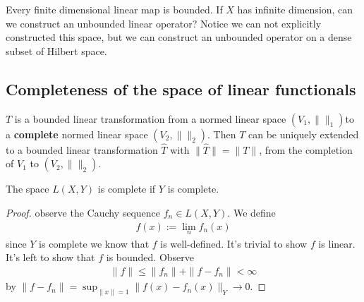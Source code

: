 \begin{remark}
Every finite dimensional linear map is bounded. If $X$ has infinite dimension, can we construct an unbounded linear operator? Notice we can not explicitly constructed this space, but we can construct an unbounded operator on a dense subset of Hilbert space.  	
\end{remark}



\subsection{Completeness of the space of linear functionals}
\begin{theorem}[B.L.T theorem]
	$T$ is a bounded linear transformation from a normed linear space $( V_1, \| \|_1 )$to a \textbf{complete} normed linear space $(V_2, \| \|_2 )$. Then $T$ can be uniquely extended to a bounded linear transformation  $\hat{T}$ with $\|\hat{T}\| = \|T\|$, from the completion of $V_1$ to $(V_2, \|\|_2)$.  
\end{theorem}

\begin{theorem}
	The space $L(X, Y)$ is complete if $Y$ is complete. 
\end{theorem}
\begin{proof}
	observe the Cauchy sequence $f_n \in L(X,Y)$. We define 
	\begin{align*}
		f(x):= \lim_n f_n(x)
	\end{align*}
	since $Y$ is complete we know that $f$ is well-defined. It's trivial to show $f$ is linear. It's left to show that $f$ is bounded. Observe
	\begin{align*}
		\|f\| \le \|f_n\| + \|f - f_n\|< \infty
	\end{align*}
	by $\|f - f_n\| = \sup_{\|x\| = 1} \|f(x) - f_n(x)\|_Y \rightarrow 0$.
\end{proof}


